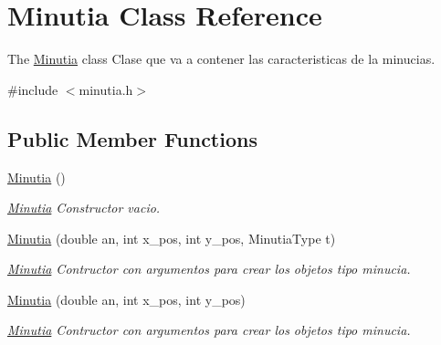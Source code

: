 \hypertarget{class_minutia}{\section{Minutia Class Reference}
\label{class_minutia}
}


The \hyperlink{class_minutia}{Minutia} class Clase que va a contener las caracteristicas de la minucias.  




{\ttfamily \#include $<$minutia.\+h$>$}

\subsection*{Public Member Functions}
\begin{DoxyCompactItemize}
\item 
\hypertarget{class_minutia_a0b52999eded30030b53e912bfdb38dc6}{\hyperlink{class_minutia_a0b52999eded30030b53e912bfdb38dc6}{Minutia} ()}\label{class_minutia_a0b52999eded30030b53e912bfdb38dc6}

\begin{DoxyCompactList}\small\item\em \hyperlink{class_minutia}{Minutia} Constructor vacio. \end{DoxyCompactList}\item 
\hyperlink{class_minutia_aae46fc644b6024bd26847f49dd40aef0}{Minutia} (double an, int x\+\_\+pos, int y\+\_\+pos, Minutia\+Type t)
\begin{DoxyCompactList}\small\item\em \hyperlink{class_minutia}{Minutia} Contructor con argumentos para crear los objetos tipo minucia. \end{DoxyCompactList}\item 
\hyperlink{class_minutia_ab63ae144e73b87457e0660ab85591a8f}{Minutia} (double an, int x\+\_\+pos, int y\+\_\+pos)
\begin{DoxyCompactList}\small\item\em \hyperlink{class_minutia}{Minutia} Contructor con argumentos para crear los objetos tipo minucia. \end{DoxyCompactList}\end{DoxyCompactItemize}

